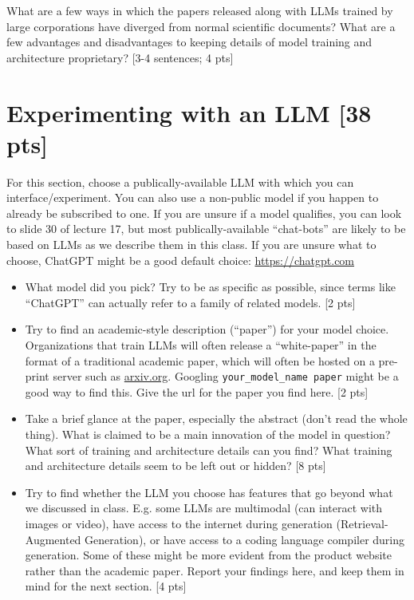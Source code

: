 \documentclass[11pt]{article}
\begin{document}
\vspace{2em}
 What are a few ways in which the papers released along with LLMs trained by large corporations have diverged from normal scientific documents? What are a few advantages and disadvantages to keeping details of model training and architecture proprietary? [3-4 sentences; 4 pts]

\section{Experimenting with an LLM [38 pts]} For this section, choose a publically-available LLM with which you can interface/experiment. You can also use a non-public model if you happen to already be subscribed to one. If you are unsure if a model qualifies, you can look to slide 30 of lecture 17, but most publically-available ``chat-bots'' are likely to be based on LLMs as we describe them in this class. If you are unsure what to choose, ChatGPT might be a good default choice: \url{https://chatgpt.com}

\vspace{1em}
\begin{itemize}
 \item What model did you pick? Try to be as specific as possible, since terms like ``ChatGPT'' can actually refer to a family of related models. [2 pts]
 \item Try to find an academic-style description (``paper'') for your model choice. Organizations that train LLMs will often release a ``white-paper'' in the format of a traditional academic paper, which will often be hosted on a pre-print server such as \url{arxiv.org}. Googling \texttt{your\_model\_name paper} might be a good way to find this. Give the url for the paper you find here. [2 pts]
 \item Take a brief glance at the paper, especially the abstract (don't read the whole thing). What is claimed to be a main innovation of the model in question? What sort of training and architecture details can you find? What training and architecture details seem to be left out or hidden? [8 pts]
 \item Try to find whether the LLM you choose has features that go beyond what we discussed in class. E.g. some LLMs are multimodal (can interact with images or video), have access to the internet during generation (Retrieval-Augmented Generation), or have access to a coding language compiler during generation. Some of these might be more evident from the product website rather than the academic paper. Report your findings here, and keep them in mind for the next section. [4 pts]
\end{itemize}
\end{document}
